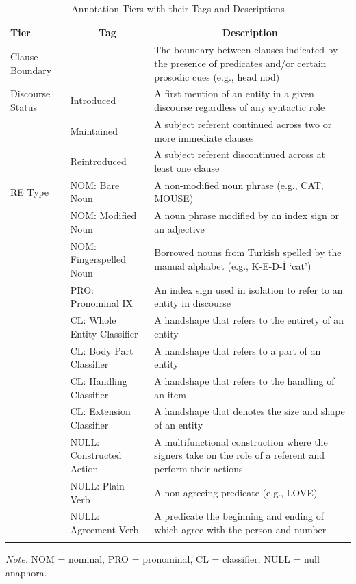 \documentclass[]{elsarticle} %
\begin{document}
\begin{table}[p]

\begin{center}
\begin{threeparttable}

\caption{\label{tab:tab-2}Annotation Tiers with their Tags and Descriptions}

\footnotesize{

\begin{tabular}{p{3.2cm}p{3.8cm}p{3.8cm}}
\toprule
Tier & \multicolumn{1}{c}{Tag} & \multicolumn{1}{c}{Description}\\
\midrule
Clause Boundary &  & The boundary between clauses indicated by the presence of predicates and/or certain prosodic cues (e.g., head nod)\\
Discourse Status & Introduced & A first mention of an entity in a given discourse regardless of any syntactic role\\
 & Maintained & A subject referent continued across two or more immediate clauses\\
 & Reintroduced & A subject referent discontinued across at least one clause\\
RE Type & NOM: Bare Noun & A non-modified noun phrase (e.g., CAT, MOUSE)\\
 & NOM: Modified Noun & A noun phrase modified by an index sign or an adjective\\
 & NOM: Fingerspelled Noun & Borrowed nouns from Turkish spelled by the manual alphabet (e.g., K-E-D-İ ‘cat’)\\
 & PRO: Pronominal IX & An index sign used in isolation to refer to an entity in discourse\\
 & CL: Whole Entity Classifier & A handshape that refers to the entirety of an entity\\
 & CL: Body Part Classifier & A handshape that refers to a part of an entity\\
 & CL: Handling Classifier & A handshape that refers to the handling of an item\\
 & CL: Extension Classifier & A handshape that denotes the size and shape of an entity\\
 & NULL: Constructed Action & A multifunctional construction where the signers take on the role of a referent and perform their actions\\
 & NULL: Plain Verb & A non-agreeing predicate (e.g., LOVE)\\
 & NULL: Agreement Verb & A predicate the beginning and ending of which agree with the person and number\\
\bottomrule
\addlinespace
\end{tabular}

}

\begin{tablenotes}[para]
\normalsize{\textit{Note.} NOM = nominal, PRO = pronominal, CL = classifier, NULL = null anaphora.}
\end{tablenotes}

\end{threeparttable}
\end{center}

\end{table}
\end{document}
